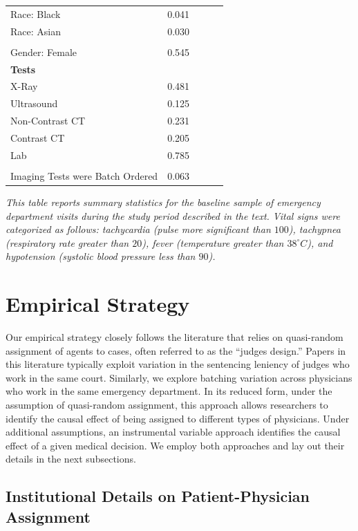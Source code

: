 \documentclass[,,nonblindrev]{informs}
\begin{document}
\begin{table}[ht]
\begin{tabular}{p{10.5cm}cccc}
Race: Black & 0.041 & & & \\
Race: Asian & 0.030 & & & \\
\\
Gender: Female & 0.545 & & & \\
\midrule
\multicolumn{5}{l}{\textbf{Tests}} \\
X-Ray & 0.481 & & & \\
Ultrasound & 0.125 & & & \\
Non-Contrast CT & 0.231 & & & \\
Contrast CT & 0.205 & & & \\
Lab & 0.785 & & & \\
\\
Imaging Tests were Batch Ordered & 0.063 & & & \\
\bottomrule
\end{tabular}
\begin{tablenotes}
\small
\item \textit{This table reports summary statistics for the baseline sample of emergency department visits during the study period described in the text. Vital signs were categorized as follows: tachycardia (pulse more significant than $100$), tachypnea (respiratory rate greater than $20$), fever (temperature greater than $38^\circ C$), and hypotension (systolic blood pressure less than $90$).}
\end{tablenotes}
\end{table}

\hypertarget{sec:3}{%
\section{Empirical Strategy}\label{sec:3}}

Our empirical strategy closely follows the literature that relies on
quasi-random assignment of agents to cases, often referred to as the
``judges design.'' Papers in this literature typically exploit variation
in the sentencing leniency of judges who work in the same court.
Similarly, we explore batching variation across physicians who work in
the same emergency department. In its reduced form, under the assumption
of quasi-random assignment, this approach allows researchers to identify
the causal effect of being assigned to different types of physicians.
Under additional assumptions, an instrumental variable approach
identifies the causal effect of a given medical decision. We employ both
approaches and lay out their details in the next subsections.

\hypertarget{institutional-details-on-patient-physician-assignment}{%
\subsection{Institutional Details on Patient-Physician
Assignment}\label{institutional-details-on-patient-physician-assignment}}
\end{document}
